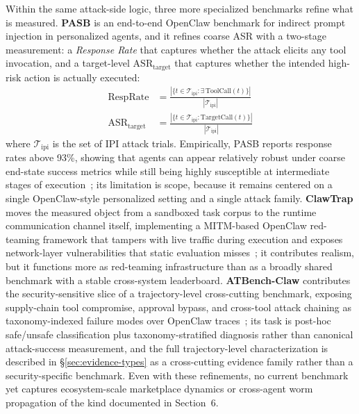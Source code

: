 Within the same attack-side logic, three more specialized benchmarks refine what is measured. \textbf{PASB} is an end-to-end OpenClaw benchmark for indirect prompt injection in personalized agents, and it refines coarse ASR with a two-stage measurement: a \emph{Response Rate} that captures whether the attack elicits any tool invocation, and a target-level $\mathrm{ASR}_{\mathrm{target}}$ that captures whether the intended high-risk action is actually executed:
\begin{align}
\mathrm{RespRate} &= \frac{|\{t \in \mathcal{T}_{\mathrm{ipi}} : \exists\, \mathrm{ToolCall}(t)\}|}{|\mathcal{T}_{\mathrm{ipi}}|} \label{eq:resprate} \\
\mathrm{ASR}_{\mathrm{target}} &= \frac{|\{t \in \mathcal{T}_{\mathrm{ipi}} : \mathrm{TargetCall}(t)\}|}{|\mathcal{T}_{\mathrm{ipi}}|} \label{eq:pasb-ipi}
\end{align}
where $\mathcal{T}_{\mathrm{ipi}}$ is the set of IPI attack trials. Empirically, PASB reports response rates above 93\%, showing that agents can appear relatively robust under coarse end-state success metrics while still being highly susceptible at intermediate stages of execution~\cite{doubleagent2026}; its limitation is scope, because it remains centered on a single OpenClaw-style personalized setting and a single attack family. \textbf{ClawTrap} moves the measured object from a sandboxed task corpus to the runtime communication channel itself, implementing a MITM-based OpenClaw red-teaming framework that tampers with live traffic during execution and exposes network-layer vulnerabilities that static evaluation misses~\cite{clawtrap2026}; it contributes realism, but it functions more as red-teaming infrastructure than as a broadly shared benchmark with a stable cross-system leaderboard. \textbf{ATBench-Claw} contributes the security-sensitive slice of a trajectory-level cross-cutting benchmark, exposing supply-chain tool compromise, approval bypass, and cross-tool attack chaining as taxonomy-indexed failure modes over OpenClaw traces~\cite{atbenchclaw2026}; its task is post-hoc safe/unsafe classification plus taxonomy-stratified diagnosis rather than canonical attack-success measurement, and the full trajectory-level characterization is described in §\ref{sec:evidence-types} as a cross-cutting evidence family rather than a security-specific benchmark. Even with these refinements, no current benchmark yet captures ecosystem-scale marketplace dynamics or cross-agent worm propagation of the kind documented in Section~6.

